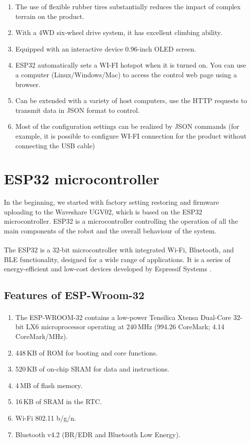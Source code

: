 \documentclass[]{IEEEphot}
\begin{document}
\begin{enumerate}
    \item The use of flexible rubber tires substantially reduces the impact of complex terrain on the product.
    \item With a 4WD six-wheel drive system, it has excellent climbing ability.
    \item Equipped with an interactive device 0.96-inch OLED screen.
    \item ESP32 automatically sets a WI-FI hotspot when it is turned on. You can use a computer (Linux/Windows/Mac) to access the control web page using a browser.
    \item Can be extended with a variety of host computers, use the HTTP requests to transmit data in JSON format to control.
    \item Most of the configuration settings can be realized by JSON commands (for example, it is possible to configure WI-FI connection for the product without connecting the USB cable)
\end{enumerate}

\section{ESP32 microcontroller}

 In the beginning, we started with factory setting restoring and firmware uploading to the Waveshare UGV02, which is based on the ESP32 microcontroller. ESP32 is a microcontroller controlling the operation of all the main components of the robot and the overall behaviour of the system.
\\\\
The ESP32 is a 32-bit microcontroller with integrated Wi-Fi, Bluetooth, and BLE functionality, designed for a wide range of applications. It is a series of energy-efficient and low-cost devices developed by Espressif Systems \cite{esp32}.

\subsection{Features of ESP-Wroom-32}

\begin{enumerate}
    \item The ESP-WROOM-32 contains a low-power Tensilica Xtensa\textsuperscript{\textregistered} Dual-Core 32-bit LX6 microprocessor operating at 240\,MHz (994.26 CoreMark; 4.14 CoreMark/MHz).
    \item 448\,KB of ROM for booting and core functions.
    \item 520\,KB of on-chip SRAM for data and instructions.
    \item 4\,MB of flash memory.
    \item 16\,KB of SRAM in the RTC.
    \item Wi-Fi 802.11 b/g/n.
    \item Bluetooth v4.2 (BR/EDR and Bluetooth Low Energy).
\end{enumerate}
\end{document}
